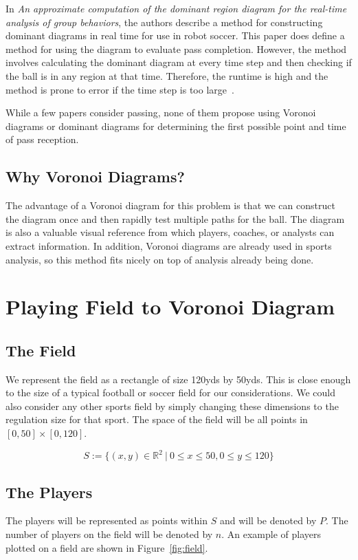 \documentclass[11pt]{article}
\begin{document}
In \textit{An approximate computation of the dominant region diagram for the real-time analysis of group behaviors}, the authors describe a method for constructing
dominant diagrams in real time for use in robot soccer. This paper does define a method for using the diagram to evaluate pass completion. However, the method
involves calculating the dominant diagram at every time step and then checking if the ball is in any region at that time. Therefore, the runtime is high
and the method is prone to error if the time step is too large~\cite{Nakanishi2010}.

While a few papers consider passing, none of them propose using Voronoi diagrams or dominant diagrams for determining the first possible point and time of pass reception.

\subsection*{Why Voronoi Diagrams?}
The advantage of a Voronoi diagram for this problem is that we can construct the diagram once and then rapidly test multiple paths for the ball.
The diagram is also a valuable visual reference from which players, coaches, or analysts can extract information.
In addition, Voronoi diagrams are already used in sports analysis, so this method fits nicely on top of analysis already being done.

\section*{Playing Field to Voronoi Diagram}
\subsection*{The Field}
We represent the field as a rectangle of size 120yds by 50yds. This is close enough to the size of a typical football or soccer field for our considerations.
We could also consider any other sports field by simply changing these dimensions to the regulation size for that sport.
The space of the field will be all points in \([0,50] \times [0,120]\).

\begin{equation}
    S := \{(x,y) \in \mathbb{R}^2 \ |\ 0 \leq x \leq 50, 0 \leq y \leq 120\}
\end{equation}

\subsection*{The Players}
The players will be represented as points within \(S\) and will be denoted by \(P\). The number of players on the field will be denoted by \(n\).
An example of players plotted on a field are shown in Figure~\ref{fig:field}.
\end{document}
